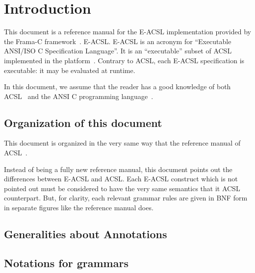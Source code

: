 \chapter{Introduction}

This document is a reference manual for
%
{the E-ACSL implementation provided by the Frama-C
  framework~\cite{frama-c}.}%
{E-ACSL.}
E-ACSL is an acronym for ``Executable ANSI/ISO C
Specification Language''. It is an ``executable'' subset of
ACSL~\cite{acsl} implemented in the \framac platform~\cite{framac}. Contrary to
ACSL, each E-ACSL specification is executable: it may be evaluated at runtime.

In this document, we assume that the reader has a good knowledge of both
ACSL~\cite{acsl} and the ANSI C programming language~\cite{KR88,standardc99}.

\section{Organization of this document}

This document is organized in the very same way that the reference manual of
ACSL~\cite{acsl}.

Instead of being a fully new reference manual, this document points out the
differences between E-ACSL and ACSL. Each E-ACSL construct which is not pointed
out must be considered to have the very same semantics that it ACSL
counterpart. But, for clarity, each relevant grammar rules are given in BNF form
in separate figures like the \acsl reference manual does.

\section{Generalities about Annotations}\label{sec:gener-about-annot}
\nodiff

\section{Notations for grammars}
\nodiff
